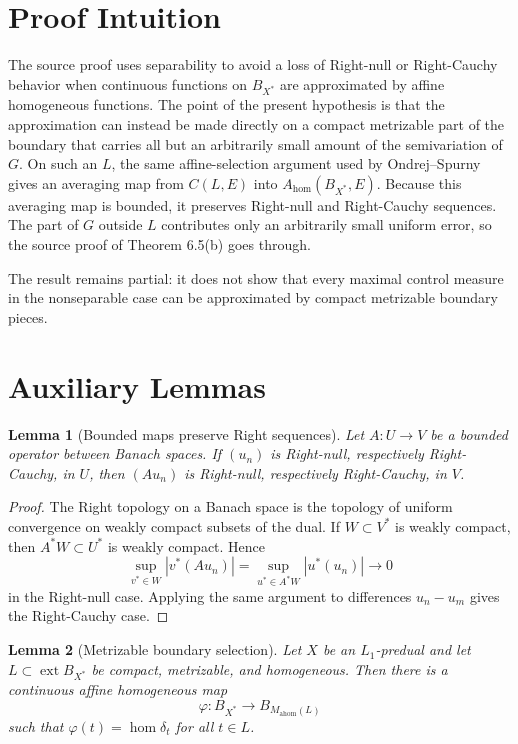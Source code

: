 \documentclass[11pt]{article}
\newtheorem{lemma}{Lemma}
\newcommand{\BX}{B_{X^*}}
\newcommand{\ext}{\operatorname{ext}}
\newcommand{\ahom}{\operatorname{ahom}}
\newcommand{\homop}{\operatorname{hom}}
\begin{document}
\section*{Proof Intuition}

The source proof uses separability to avoid a loss of Right-null or Right-Cauchy behavior when continuous functions on \(\BX\) are approximated by affine homogeneous functions.  The point of the present hypothesis is that the approximation can instead be made directly on a compact metrizable part of the boundary that carries all but an arbitrarily small amount of the semivariation of \(G\).  On such an \(L\), the same affine-selection argument used by Ondrej--Spurny gives an averaging map from \(C(L,E)\) into \(A_{\homop}(\BX,E)\).  Because this averaging map is bounded, it preserves Right-null and Right-Cauchy sequences.  The part of \(G\) outside \(L\) contributes only an arbitrarily small uniform error, so the source proof of Theorem 6.5(b) goes through.

The result remains partial: it does not show that every maximal control measure in the nonseparable case can be approximated by compact metrizable boundary pieces.

\section*{Auxiliary Lemmas}

\begin{lemma}[Bounded maps preserve Right sequences]
\label{lem:right-functorial}
Let \(A:U\to V\) be a bounded operator between Banach spaces.  If \((u_n)\) is Right-null, respectively Right-Cauchy, in \(U\), then \((Au_n)\) is Right-null, respectively Right-Cauchy, in \(V\).
\end{lemma}

\begin{proof}
The Right topology on a Banach space is the topology of uniform convergence on weakly compact subsets of the dual.  If \(W\subset V^*\) is weakly compact, then \(A^*W\subset U^*\) is weakly compact.  Hence
\[
  \sup_{v^*\in W}|v^*(Au_n)|
  =
  \sup_{u^*\in A^*W}|u^*(u_n)|\to 0
\]
in the Right-null case.  Applying the same argument to differences \(u_n-u_m\) gives the Right-Cauchy case.
\end{proof}

\begin{lemma}[Metrizable boundary selection]
\label{lem:selection}
Let \(X\) be an \(L_1\)-predual and let \(L\subset \ext \BX\) be compact, metrizable, and homogeneous.  Then there is a continuous affine homogeneous map
\[
  \varphi:\BX\to B_{M_{\ahom}(L)}
\]
such that \(\varphi(t)=\homop\delta_t\) for all \(t\in L\).
\end{lemma}
\end{document}
